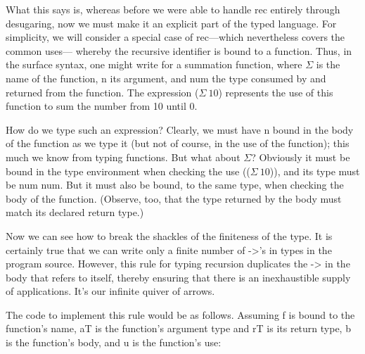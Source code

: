 
What this says is, whereas before we were able to handle rec entirely through
desugaring, now we must make it an explicit part of the typed language. For
simplicity, we will consider a special case of rec—which nevertheless covers the
common uses— whereby the recursive identifier is bound to a function. Thus, in
the surface syntax, one might write
for a summation function, where $\Sigma$ is the name of the function, n its
argument, and num the type consumed by and returned from the function. The expression
($\Sigma\ 10$) represents the use of this function to sum the number from 10
until 0.

How do we type such an expression? Clearly, we must have n bound in the body of
the function as we type it (but not of course, in the use of the function); this
much we know from typing functions. But what about $\Sigma$? Obviously it must
be bound in the type environment when checking the use (($\Sigma\ 10$)), and its
type must be num
num. But it must also be bound, to the same type, when checking the body of the
function. (Observe, too, that the type returned by the body must match its
declared return type.)

Now we can see how to break the shackles of the finiteness of the type. It is
certainly true that we can write only a finite number of ->’s in types in the
program source. However, this rule for typing recursion duplicates the -> in the
body that refers to itself, thereby ensuring that there is an inexhaustible
supply of applications. It’s our infinite quiver of arrows.

The code to implement this rule would be as follows. Assuming f is bound to the
function’s name, aT is the function’s argument type and rT is its return type, b
is the function’s body, and u is the function’s use:

\secup
